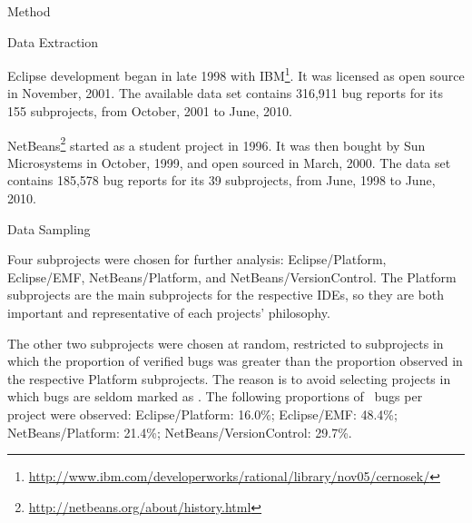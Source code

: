 \begin{section}{Method}
\begin{subsection}{Data Extraction}

	Eclipse development began in late 1998 with IBM\footnote{\url{http://www.ibm.com/developerworks/rational/library/nov05/cernosek/}}. It was licensed as open source in November, 2001. The available data set contains 316,911 bug reports for its 155 subprojects, from October, 2001 to June, 2010.
		
	NetBeans\footnote{\url{http://netbeans.org/about/history.html}} started  as a student project in 1996. It was then bought by Sun Microsystems in October, 1999, and open sourced in March, 2000. The data set contains 185,578 bug reports for its 39 subprojects, from June, 1998 to June, 2010.
	
\end{subsection}

\begin{subsection}{Data Sampling}

	Four subprojects were chosen for further analysis: Eclipse/Platform, Eclipse/EMF, NetBeans/Platform, and NetBeans/VersionControl. The Platform subprojects are the main subprojects for the respective IDEs, so they are both important and representative of each projects' philosophy. 
	
	The other two subprojects were chosen at random, restricted to subprojects in which the proportion of verified bugs was greater than the proportion observed in the respective Platform subprojects. The reason is to avoid selecting projects in which bugs are seldom marked as \VERIFIED. The following proportions of \VERIFIED\ bugs per project were observed: Eclipse/Platform: 16.0\%; Eclipse/EMF: 48.4\%; NetBeans/Platform: 21.4\%; NetBeans/VersionControl: 29.7\%.
	
	
	

\end{subsection}
\end{section}
